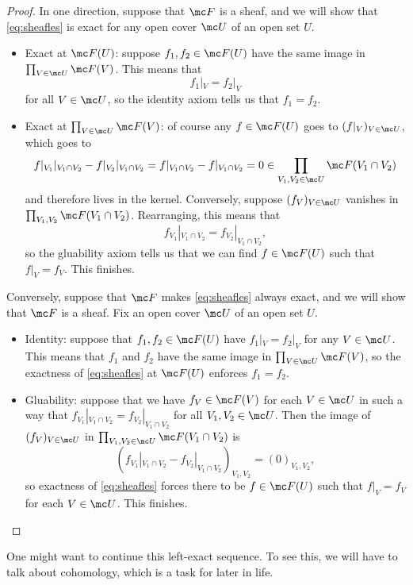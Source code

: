 \documentclass[../notes.tex]{subfiles}
\begin{document}
\begin{proof}
	In one direction, suppose that $\mc F$ is a sheaf, and we will show that \autoref{eq:sheafles} is exact for any open cover $\mc U$ of an open set $U$.
	\begin{itemize}
		\item Exact at $\mc F(U)$: suppose $f_1,f_2\in\mc F(U)$ have the same image in $\prod_{V\in\mc U}\mc F(V)$. This means that
		\[f_1|_V=f_2|_V\]
		for all $V\in\mc U$, so the identity axiom tells us that $f_1=f_2$.
		\item Exact at $\prod_{V\in\mc U}\mc F(V)$: of course any $f\in\mc F(U)$ goes to $(f|_V)_{V\in\mc U}$, which goes to
		\[f|_{V_1}|_{V_1\cap V_2}-f|_{V_2}|_{V_1\cap V_2}=f|_{V_1\cap V_2}-f|_{V_1\cap V_2}=0\in\prod_{V_1,V_2\in\mc U}\mc F(V_1\cap V_2)\]
		and therefore lives in the kernel. Conversely, suppose $(f_V)_{V\in\mc U}$ vanishes in $\prod_{V_1,V_2}\mc F(V_1\cap V_2)$. Rearranging, this means that
		\[f_{V_1}|_{V_1\cap V_2}=f_{V_2}|_{V_1\cap V_2},\]
		so the gluability axiom tells us that we can find $f\in\mc F(U)$ such that $f|_V=f_V$. This finishes.
	\end{itemize}
	Conversely, suppose that $\mc F$ makes \autoref{eq:sheafles} always exact, and we will show that $\mc F$ is a sheaf. Fix an open cover $\mc U$ of an open set $U$.
	\begin{itemize}
		\item Identity: suppose that $f_1,f_2\in\mc F(U)$ have $f_1|_V=f_2|_V$ for any $V\in\mc U$. This means that $f_1$ and $f_2$ have the same image in $\prod_{V\in\mc U}\mc F(V)$, so the exactness of \autoref{eq:sheafles} at $\mc F(U)$ enforces $f_1=f_2$.
		\item Gluability: suppose that we have $f_V\in\mc F(V)$ for each $V\in\mc U$ in such a way that $f_{V_1}|_{V_1\cap V_2}=f_{V_2}|_{V_1\cap V_2}$ for all $V_1,V_2\in\mc U$. Then the image of $(f_V)_{V\in\mc U}$ in $\prod_{V_1,V_2\in\mc U}\mc F(V_1\cap V_2)$ is
		\[(f_{V_1}|_{V_1\cap V_2}-f_{V_2}|_{V_1\cap V_2})_{V_1,V_2}=(0)_{V_1,V_2},\]
		so exactness of \autoref{eq:sheafles} forces there to be $f\in\mc F(U)$ such that $f|_V=f_V$ for each $V\in\mc U$. This finishes.
		\qedhere
	\end{itemize}
\end{proof}
\begin{remark}
	One might want to continue this left-exact sequence. To see this, we will have to talk about cohomology, which is a task for later in life.
\end{remark}
\end{document}
